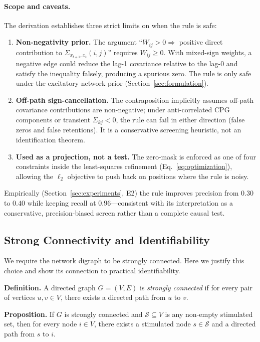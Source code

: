 \documentclass{article}
\begin{document}
\paragraph{Scope and caveats.}
The derivation establishes three strict limits on when the rule is safe:
\begin{enumerate}
    \item \textbf{Non-negativity prior.} The argument ``$W_{ij} > 0 \Rightarrow$ positive direct contribution to $\Sigma_{x_{t+1},x_t}(i,j)$'' requires $W_{ij} \geq 0$. With mixed-sign weights, a negative edge could reduce the lag-1 covariance relative to the lag-0 and satisfy the inequality falsely, producing a spurious zero. The rule is only safe under the excitatory-network prior (Section~\ref{sec:formulation}).
    \item \textbf{Off-path sign-cancellation.} The contraposition implicitly assumes off-path covariance contributions are non-negative; under anti-correlated CPG components or transient $\Sigma_{kj}<0$, the rule can fail in either direction (false zeros and false retentions). It is a conservative screening heuristic, not an identification theorem.
    \item \textbf{Used as a projection, not a test.} The zero-mask is enforced as one of four constraints inside the least-squares refinement (Eq.~\eqref{eq:optimization}), allowing the $\ell_2$ objective to push back on positions where the rule is noisy.
\end{enumerate}
Empirically (Section~\ref{sec:experiments}, E2) the rule improves precision from $0.30$ to $0.40$ while keeping recall at $0.96$---consistent with its interpretation as a conservative, precision-biased screen rather than a complete causal test.

\subsection{Strong Connectivity and Identifiability}
\label{sec:app_connectivity}

We require the network digraph to be strongly connected.
Here we justify this choice and show its connection to practical identifiability.

\textbf{Definition.} A directed graph $G = (V, E)$ is \emph{strongly connected} if for every pair of vertices $u, v \in V$, there exists a directed path from $u$ to $v$.

\textbf{Proposition.} If $G$ is strongly connected and $\mathcal{S} \subseteq V$ is any non-empty stimulated set, then for every node $i \in V$, there exists a stimulated node $s \in \mathcal{S}$ and a directed path from $s$ to $i$.
\end{document}
